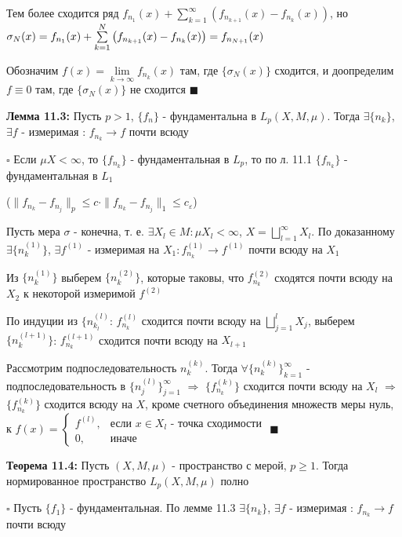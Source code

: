 \documentclass[a4paper]{report}
\newcommand*{\hm}[1]{#1\nobreak\discretionary{}%
            {\hbox{$\mathsurround=0pt #1$}}{}}
\begin{document}
Тем более сходится ряд $f_{n_1}(x)+\sum\limits_{k=1}^\infty\left(f_{n_{k+1}}(x)-f_{n_k}(x)\right)$, но $\sigma_N(x)=f_{n_1}(x)\hm+\sum\limits_{k=1}^N\left(f_{n_{k+1}}(x)-f_{n_k}(x)\right)=f_{n_{N+1}}(x)$

Обозначим $f(x)=\lim\limits_{k\to\infty}f_{n_k}(x)$ там, где $\{\sigma_N(x)\}$ сходится, и доопределим $f\equiv0$ там, где $\{\sigma_N(x)\}$ не сходится 
$\blacksquare$
\bigskip

\noindent\textbf{Лемма 11.3:} Пусть $p>1$, $\{f_n\}$ - фундаментальна в $L_p(X,M,\mu)$. Тогда $\exists\{n_k\}$, $\exists f$ - измеримая : $f_{n_k}\to f$ почти всюду

\noindent $\square$ Если $\mu X<\infty$, то $\{f_{n_k}\}$ - фундаментальная в $L_p$, то по л. 11.1 $\{f_{n_k}\}$ - фундаментальная в $L_1$

($\|f_{n_k}-f_{n_j}\|_p\le c\cdot\|f_{n_k}-f_{n_j}\|_1\le c_\varepsilon$)

Пусть мера $\sigma$ - конечна, т. е. $\exists X_l\in M\colon\mu X_l<\infty$, $X=\bigsqcup\limits_{l=1}^\infty X_l$. По доказанному $\exists\{n_k^{(1)}\}$, $\exists f^{(1)}$  - измеримая на $X_1\colon f_{n_k}^{(1)}\to f^{(1)}$ почти всюду на $X_1$

Из $\{n_k^{(1)}\}$ выберем $\{n_k^{(2)}\}$, которые таковы, что $f_{n_k}^{(2)}$ сходятся почти всюду на $X_2$ к некоторой измеримой $f^{(2)}$

По индуции из $\{n_{k_l}^{(l)}$: $f_{n_k}^{(l)}$ сходится почти всюду на $\bigsqcup\limits_{j=1}^l X_j$, выберем $\{n_k^{(l+1)}\}$: $f_{n_k}^{(l+1)}$ сходится почти всюду на $X_{l+1}$

Рассмотрим подпоследовательность $n_k^{(k)}$. Тогда $\forall\{n_k^{(k)}\}_{k=1}^\infty$ - подпоследовательность в $\{n_j^{(l)}\}_{j=1}^\infty$ $\Rightarrow$ $\{f_{n_k}^{(k)}\}$ сходится почти всюду на $X_l$ $\Rightarrow$ $\{f_{n_k}^{(k)}\}$ сходится всюду на $X$, кроме счетного объединения множеств меры нуль, к $f(x)=\begin{cases}f^{(l)},&\text{если }x\in X_l\text{ - точка сходимости}\\0,&\text{иначе}\end{cases}$ $\blacksquare$
\bigskip

\noindent\textbf{Теорема 11.4:} Пусть $(X,M,\mu)$ - пространство с мерой, $p\ge1$. Тогда нормированное пространство $L_p(X,M,\mu)$ полно

\noindent $\square$ Пусть $\{f_1\}$ - фундаментальная. По лемме 11.3 $\exists\{n_k\}$, $\exists f$ - измеримая : $f_{n_k}\to f$ почти всюду
\end{document}
